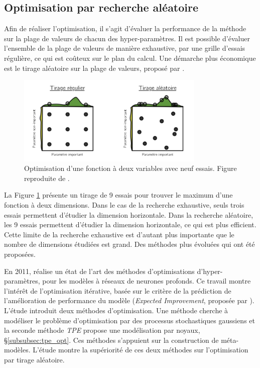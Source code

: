 \subsection{Optimisation par recherche aléatoire} \label{subsec:random_search}
Afin de réaliser l'optimisation, il s'agit d'évaluer la performance de la méthode sur la plage de valeurs de chacun des hyper-paramètres.
Il est possible d'évaluer l'ensemble de la plage de valeurs de manière exhaustive, par une grille d'essais régulière, ce qui est coûteux sur le plan du calcul.
Une démarche plus économique est le tirage aléatoire sur la plage de valeurs, proposé par \cite{bergstra_random_2012}.

\begin{figure}[hbtp]
    \centering
    \includegraphics[width=0.80\textwidth,height=\textheight,keepaspectratio]{../Chap3/Figures/bergstra_RandomSearch2002.png}
    \caption{Optimisation d'une fonction à deux variables avec neuf essais. Figure reproduite de \cite{bergstra_random_2012}.}
    \label{fig:random_search}
\end{figure}

La Figure \ref{fig:random_search} présente un tirage de 9 essais pour trouver le maximum d'une fonction à deux dimensions.
Dans le cas de la recherche exhaustive, seuls trois essais permettent d'étudier la dimension horizontale.
Dans la recherche aléatoire, les 9 essais permettent d'étudier la dimension horizontale, ce qui est plus efficient.
Cette limite de la recherche exhaustive est d'autant plus importante que le nombre de dimensions étudiées est grand.
Des méthodes plus évoluées qui ont été proposées.


En 2011, \cite{bergstra_algorithms_2011} réalise un état de l'art des méthodes d'optimisations d'hyper-paramètres, pour les modèles à réseaux de neurones profonds.
Ce travail montre l'intérêt de l'optimisation itérative, basée sur le critère de la prédiction de l'amélioration de performance du modèle (\textit{Expected Improvement}, proposée par \cite{jones_taxonomy_2001}).
L'étude introduit deux méthodes d'optimisation.
Une méthode cherche à modéliser le problème d'optimisation par des processus stochastiques gaussiens et la seconde méthode \textit{TPE} propose une modélisation par noyaux, §\ref{subsubsec:tpe_opt}.
Ces méthodes s'appuient sur la construction de méta-modèles.
L'étude montre la supériorité de ces deux méthodes sur l'optimisation par tirage aléatoire.

